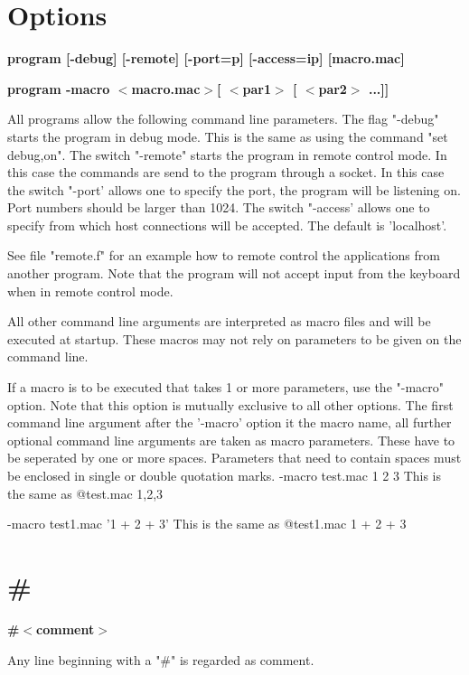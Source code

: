 \section{Options}
{\bf program [-debug] [-remote] [-port=p] [-access=ip] [macro.mac] \par }
{\bf program -macro $ <$macro.mac$> $[ $ <$par1$> $ [ $ <$par2$> $ ...]] \par }
\par
\vspace{3pt}
All programs allow the following command line parameters. The flag 
"-debug" starts the program in debug mode. This is the same as using 
the command "set debug,on". The switch "-remote" starts the program 
in remote control mode. In this case the commands are send to the 
program through a socket. In this case the switch "-port' allows one 
to specify the port, the program will be listening on. Port numbers 
should be larger than 1024. The switch "-access' allows one to specify 
from which host connections will be accepted. The default is 
'localhost'. 
\par
See file "remote.f" for an example how to remote control the 
applications from another program. Note that the program will not 
accept input from the keyboard when in remote control mode. 
\par
All other command line arguments are interpreted as macro files 
and will be executed at startup. These macros may not rely on 
parameters to be given on the command line. 
\par
If a macro is to be executed that takes 1 or more parameters, use 
the "-macro" option. Note that this option is mutually exclusive 
to all other options. The first command line argument after  the 
'-macro' option it the macro name, all further optional command 
line arguments are taken as macro parameters. These have to be 
seperated by one or more spaces. 
Parameters that need to contain spaces must be enclosed in single 
or double quotation marks. 
-macro test.mac 1 2 3 
This is the same as @test.mac 1,2,3 
\par
-macro test1.mac '1 + 2 + 3' 
This is the same as @test1.mac 1 + 2 + 3 
\section{\#}
{\bf \#$ <$comment$> $ \par }
\par
\vspace{3pt}
Any line beginning with a "\#" is regarded as comment. 
